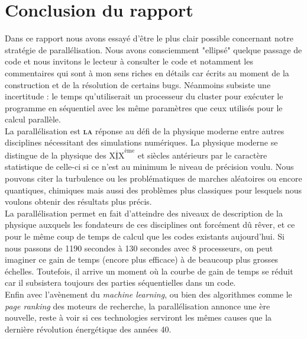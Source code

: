 \documentclass[french]{article}
\newcommand{\navy}{\color{navy}}
\newcommand{\bk}{\color{black}}
\begin{document}
\navy \section*{Conclusion du rapport} \bk
Dans ce rapport nous avons essayé d'être le plus clair possible concernant notre stratégie de parallélisation. Nous avons consciemment "ellipsé" quelque passage de code et nous invitons le lecteur à consulter le code et notamment les commentaires qui sont à mon sens riches en détails car écrits au moment de la construction et de la résolution de certains bugs. Néanmoins subsiste une incertitude : le temps qu'utiliserait un processeur du cluster pour exécuter le programme en séquentiel avec les même paramètres que ceux utilisés pour le calcul parallèle.\\
La parallélisation est \textsc{\textbf{la}} réponse au défi de la physique moderne entre autres disciplines nécessitant des simulations numériques. 
La physique moderne se distingue de la physique des $\underline{\overline{\text{XIX}}}^{\text{ème}}$ et siècles antérieurs par le caractère statistique de celle-ci si ce n'est au minimum le niveau de précision voulu. Nous pouvons citer la turbulence ou les problématiques de marches aléatoires ou encore quantiques, chimiques mais aussi des problèmes plus classiques pour lesquels nous voulons obtenir des résultats plus précis. 
\\ La parallélisation permet en fait d'atteindre des niveaux de description de la physique auxquels les fondateurs de ces disciplines ont forcément dû rêver, et ce pour le même coup de temps de calcul que les codes existants aujourd'hui. Si nous passons de 1190 secondes à 130 secondes avec 8 processeurs, on peut imaginer ce gain de temps (encore plus efficace) à de beaucoup plus grosses échelles. Toutefois, il arrive un moment où la courbe de gain de temps se réduit car il subsistera toujours des parties séquentielles dans un code.\\
 Enfin avec l'avènement du \textit{machine learning}, ou bien des algorithmes comme le \textit{page ranking} des moteurs de recherche, la parallélisation annonce une ère nouvelle, reste à voir si ces technologies serviront les mêmes causes que la dernière révolution énergétique des années 40.
\end{document}
